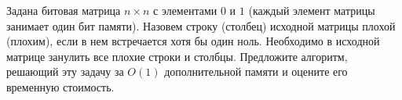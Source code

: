 \documentclass{article}
\begin{document}
Задана битовая матрица $n\times n$ с элементами $0$ и $1$ (каждый элемент матрицы занимает один бит памяти). 
Назовем строку (столбец) исходной матрицы плохой (плохим), если в нем встречается хотя бы один ноль. Необходимо в исходной матрице занулить все плохие строки и столбцы. 
Предложите алгоритм, решающий эту задачу за $O(1)$ дополнительной памяти и оцените его временную стоимость.
\end{document}
